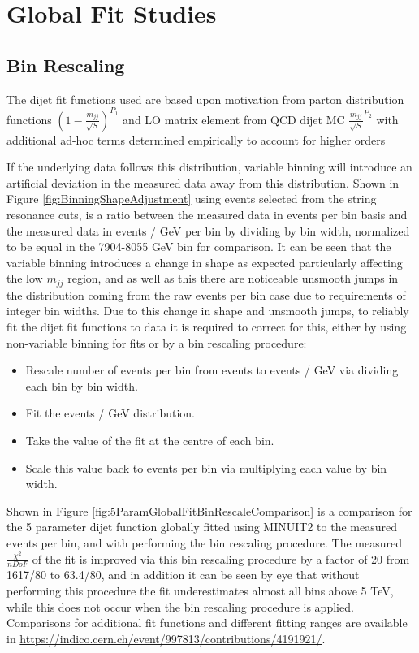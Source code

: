 \section{Global Fit Studies}
\label{sec:globalFitStudies}
\subsection{Bin Rescaling}
\label{subsec:binRescaling:GlobalFitting}
The dijet fit functions used are based upon motivation from parton distribution functions $\left(1-\frac{m_{jj}}{\sqrt{S}}\right)^{P_{1}}$ and LO matrix element from QCD dijet MC $\frac{m_{jj}}{\sqrt{S}}^{P_{2}}$ with additional ad-hoc terms determined empirically to account for higher orders %

If the underlying data follows this distribution, variable binning will introduce an artificial deviation in the measured data away from this distribution. Shown in Figure \ref{fig:BinningShapeAdjustment} using events selected from the string resonance cuts, is a ratio between the measured data in events per bin basis and the measured data in events / GeV per bin by dividing by bin width, normalized to be equal in the 7904-8055 GeV bin for comparison. It can be seen that the variable binning introduces a change in shape as expected particularly affecting the low $m_{jj}$ region, and as well as this there are noticeable unsmooth jumps in the distribution coming from the raw events per bin case due to requirements of integer bin widths. Due to this change in shape and unsmooth jumps, to reliably fit the dijet fit functions to data it is required to correct for this, either by using non-variable binning for fits or by a bin rescaling procedure:

\begin{itemize}
    \item Rescale number of events per bin from events to events / GeV via dividing each bin by bin width.
    \item Fit the events / GeV distribution.
    \item Take the value of the fit at the centre of each bin.
    \item Scale this value back to events per bin via multiplying each value by bin width.
\end{itemize}

Shown in Figure \ref{fig:5ParamGlobalFitBinRescaleComparison} is a comparison for the 5 parameter dijet function globally fitted using MINUIT2 to the measured events per bin, and with performing the bin rescaling procedure. The measured $\frac{\chi^{2}}{nDoF}$ of the fit is improved via this bin rescaling procedure by a factor of 20 from 1617/80 to 63.4/80, and in addition it can be seen by eye that without performing this procedure the fit underestimates almost all bins above 5 TeV, while this does not occur when the bin rescaling procedure is applied. Comparisons for additional fit functions and different fitting ranges are available in {\href{https://indico.cern.ch/event/997813/contributions/4191921/attachments/2178521/3679266/dijet_CompareBinRescale_26_01_2021.pdf}{https://indico.cern.ch/event/997813/contributions/4191921/}}.


